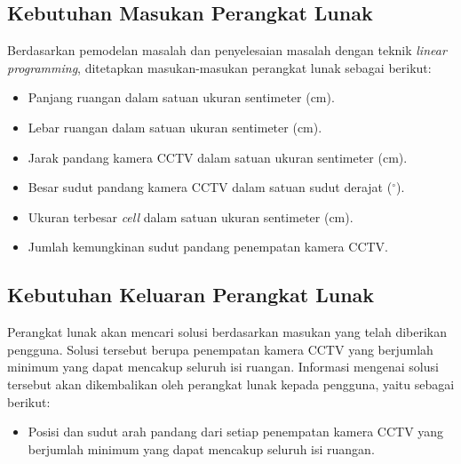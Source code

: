 \begin{itemize}
\end{itemize}

\subsection{Kebutuhan Masukan Perangkat Lunak}
Berdasarkan pemodelan masalah dan penyelesaian masalah dengan teknik \textit{linear programming}, ditetapkan masukan-masukan perangkat lunak sebagai berikut:
\begin{itemize}
	\item Panjang ruangan dalam satuan ukuran sentimeter (cm).
	\item Lebar ruangan dalam satuan ukuran sentimeter (cm).
	\item Jarak pandang kamera CCTV dalam satuan ukuran sentimeter (cm).
	\item Besar sudut pandang kamera CCTV dalam satuan sudut derajat (\(^\circ\)).
	\item Ukuran terbesar \textit{cell} dalam satuan ukuran sentimeter (cm).
	\item Jumlah kemungkinan sudut pandang penempatan kamera CCTV.
\end{itemize}

\subsection{Kebutuhan Keluaran Perangkat Lunak}
Perangkat lunak akan mencari solusi berdasarkan masukan yang telah diberikan pengguna. Solusi tersebut berupa penempatan kamera CCTV yang berjumlah minimum yang dapat mencakup seluruh isi ruangan. Informasi mengenai solusi tersebut akan dikembalikan oleh perangkat lunak kepada pengguna, yaitu sebagai berikut:
\begin{itemize}
	\item Posisi dan sudut arah pandang dari setiap penempatan kamera CCTV yang berjumlah minimum yang dapat mencakup seluruh isi ruangan.
\end{itemize}

